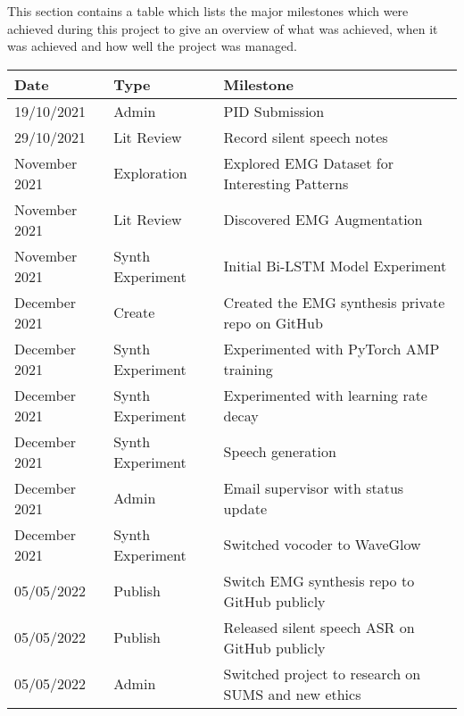 This section contains a table which lists the major milestones which were
achieved during this project to give an overview of what was achieved, when it was
achieved and how well the project was managed.

{\small\begin{center}
    \begin{tabularx}{\textwidth}{ l l l }
        Date & Type & Milestone \\
        \hline
        19/10/2021 & Admin & PID Submission \\
        29/10/2021 & Lit Review & Record silent speech notes \\
        November 2021 & Exploration & Explored EMG Dataset for Interesting Patterns \\
        November 2021 & Lit Review & Discovered EMG Augmentation \\
        November 2021 & Synth Experiment & Initial Bi-LSTM Model Experiment \\
        December 2021 & Create & Created the EMG synthesis private repo on GitHub \\
        December 2021 & Synth Experiment & Experimented with PyTorch AMP training \\
        December 2021 & Synth Experiment & Experimented with learning rate decay \\
        December 2021 & Synth Experiment & Speech generation \\
        December 2021 & Admin & Email supervisor with status update \\
        December 2021 & Synth Experiment & Switched vocoder to WaveGlow \\
        05/05/2022 & Publish & Switch EMG synthesis repo to GitHub publicly \\
        05/05/2022 & Publish & Released silent speech ASR on GitHub publicly \\
        05/05/2022 & Admin & Switched project to research on SUMS and new ethics
    \end{tabularx}
\end{center}}